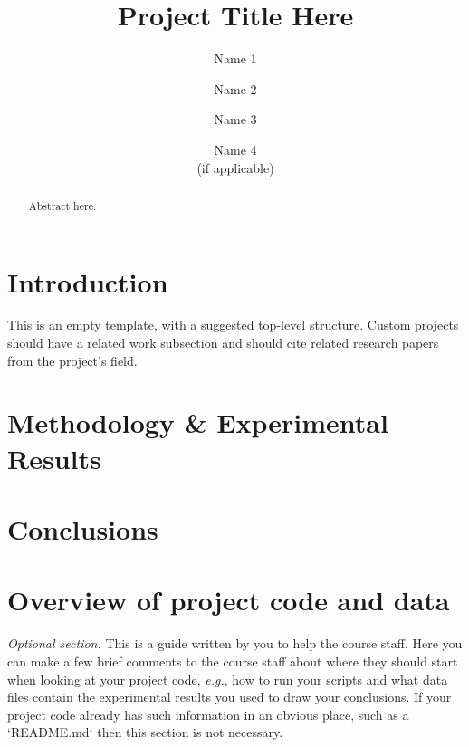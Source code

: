 \documentclass[10pt,twocolumn,letterpaper]{article}
\begin{document}
\title{Project Title Here}
\author{Name 1 \and Name 2 \and Name 3 \and Name 4\\(if applicable)}
\maketitle

\begin{abstract}
   Abstract here.
\end{abstract}

\section{Introduction}

This is an empty template, with a suggested top-level structure.
Custom projects should have a related work subsection and should
cite related research papers from the project's field.

\section{Methodology \& Experimental Results}



\section{Conclusions}



\appendix


\section{Overview of project code and data}

{\em Optional section.} This is a guide written by you to help the course staff.
Here you can make a few brief comments to the course staff about where
they should start when looking at your project code, {\em e.g.}, how to run your scripts and what
data files contain the experimental results you used to draw your conclusions.
If your project code already has such information in an obvious place, such as a `README.md`
then this section is not necessary.
\end{document}
